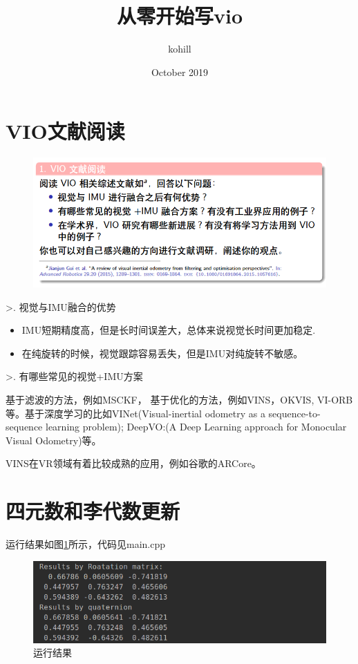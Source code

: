 \documentclass[11pt,twoside,a4paper]{article}
\title{从零开始写vio}
\author{kohill}
\date{October 2019}
\begin{document}
\section{VIO文献阅读}
\begin{figure}[htbp]
    \centering
    \includegraphics[width=0.9\linewidth]{001.png}
\end{figure}

>. 视觉与IMU融合的优势
\begin{itemize}
    \item IMU短期精度高，但是长时间误差大，总体来说视觉长时间更加稳定. 
    \item 在纯旋转的时候，视觉跟踪容易丢失，但是IMU对纯旋转不敏感。
\end{itemize}

>. 有哪些常见的视觉+IMU方案

基于滤波的方法，例如MSCKF， 基于优化的方法，例如VINS，OKVIS, VI-ORB等。基于深度学习的比如VINet(Visual-inertial odometry as a sequence-to-sequence learning problem);
DeepVO:(A Deep Learning approach for Monocular Visual Odometry)等。

VINS在VR领域有着比较成熟的应用，例如谷歌的ARCore。


\section{四元数和李代数更新}
运行结果如图\ref{fig:executeresult}所示，代码见main.cpp
\begin{figure}[h]
    \centering
    \includegraphics[width=0.9\linewidth]{003.png}
    \caption{运行结果}    
    \label{fig:executeresult}
\end{figure}
\end{document}

